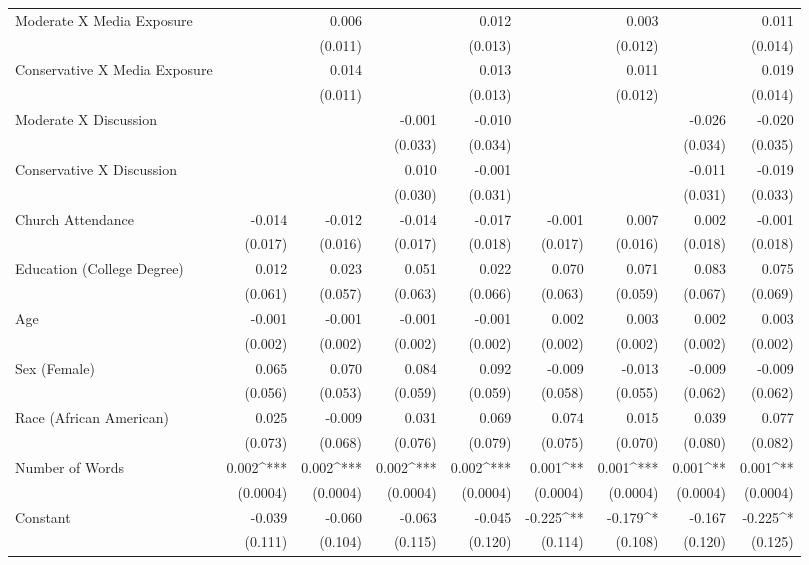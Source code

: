 \begin{table}[ht]
\begin{tabular}{@{\extracolsep{-15pt}}lD{.}{.}{-3} D{.}{.}{-3} D{.}{.}{-3} D{.}{.}{-3} D{.}{.}{-3} D{.}{.}{-3} D{.}{.}{-3} D{.}{.}{-3} }
  Moderate X Media Exposure &  & 0.006 &  & 0.012 &  & 0.003 &  & 0.011 \\ 
  &  & (0.011) &  & (0.013) &  & (0.012) &  & (0.014) \\ 
  Conservative X Media Exposure &  & 0.014 &  & 0.013 &  & 0.011 &  & 0.019 \\ 
  &  & (0.011) &  & (0.013) &  & (0.012) &  & (0.014) \\ 
  Moderate X Discussion &  &  & -0.001 & -0.010 &  &  & -0.026 & -0.020 \\ 
  &  &  & (0.033) & (0.034) &  &  & (0.034) & (0.035) \\ 
  Conservative X Discussion &  &  & 0.010 & -0.001 &  &  & -0.011 & -0.019 \\ 
  &  &  & (0.030) & (0.031) &  &  & (0.031) & (0.033) \\ 
  Church Attendance & -0.014 & -0.012 & -0.014 & -0.017 & -0.001 & 0.007 & 0.002 & -0.001 \\ 
  & (0.017) & (0.016) & (0.017) & (0.018) & (0.017) & (0.016) & (0.018) & (0.018) \\ 
  Education (College Degree) & 0.012 & 0.023 & 0.051 & 0.022 & 0.070 & 0.071 & 0.083 & 0.075 \\ 
  & (0.061) & (0.057) & (0.063) & (0.066) & (0.063) & (0.059) & (0.067) & (0.069) \\ 
  Age & -0.001 & -0.001 & -0.001 & -0.001 & 0.002 & 0.003 & 0.002 & 0.003 \\ 
  & (0.002) & (0.002) & (0.002) & (0.002) & (0.002) & (0.002) & (0.002) & (0.002) \\ 
  Sex (Female) & 0.065 & 0.070 & 0.084 & 0.092 & -0.009 & -0.013 & -0.009 & -0.009 \\ 
  & (0.056) & (0.053) & (0.059) & (0.059) & (0.058) & (0.055) & (0.062) & (0.062) \\ 
  Race (African American) & 0.025 & -0.009 & 0.031 & 0.069 & 0.074 & 0.015 & 0.039 & 0.077 \\ 
  & (0.073) & (0.068) & (0.076) & (0.079) & (0.075) & (0.070) & (0.080) & (0.082) \\ 
  Number of Words & 0.002^{***} & 0.002^{***} & 0.002^{***} & 0.002^{***} & 0.001^{**} & 0.001^{***} & 0.001^{**} & 0.001^{**} \\ 
  & (0.0004) & (0.0004) & (0.0004) & (0.0004) & (0.0004) & (0.0004) & (0.0004) & (0.0004) \\ 
  Constant & -0.039 & -0.060 & -0.063 & -0.045 & -0.225^{**} & -0.179^{*} & -0.167 & -0.225^{*} \\ 
  & (0.111) & (0.104) & (0.115) & (0.120) & (0.114) & (0.108) & (0.120) & (0.125) \\ 

\end{tabular}
\end{table}
